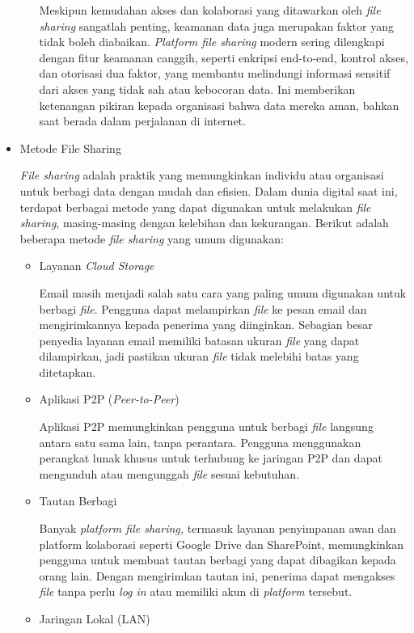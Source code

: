 \documentclass[12pt]{article}
\begin{document}
\begin{itemize}
\begin{itemize}
       Meskipun kemudahan akses dan kolaborasi yang ditawarkan oleh \textit{file sharing} sangatlah penting, keamanan data juga merupakan faktor yang tidak boleh diabaikan. \textit{Platform file sharing} modern sering dilengkapi dengan fitur keamanan canggih, seperti enkripsi end-to-end, kontrol akses, dan otorisasi dua faktor, yang membantu melindungi informasi sensitif dari akses yang tidak sah atau kebocoran data. Ini memberikan ketenangan pikiran kepada organisasi bahwa data mereka aman, bahkan saat berada dalam perjalanan di internet.
       \vspace{2pt}
    \end{itemize}
    \item Metode File Sharing

    \textit{File sharing} adalah praktik yang memungkinkan individu atau organisasi untuk berbagi data dengan mudah dan efisien. Dalam dunia digital saat ini, terdapat berbagai metode yang dapat digunakan untuk melakukan \textit{file sharing}, masing-masing dengan kelebihan dan kekurangan. Berikut adalah beberapa metode \textit{file sharing} yang umum digunakan:

    \begin{itemize}
        \item Layanan \textit{Cloud Storage}

        Email masih menjadi salah satu cara yang paling umum digunakan untuk berbagi \textit{file}. Pengguna dapat melampirkan \textit{file} ke pesan email dan mengirimkannya kepada penerima yang diinginkan. Sebagian besar penyedia layanan email memiliki batasan ukuran \textit{file} yang dapat dilampirkan, jadi pastikan ukuran \textit{file} tidak melebihi batas yang ditetapkan.
        \item Aplikasi P2P (\textit{Peer-to-Peer})

        Aplikasi P2P memungkinkan pengguna untuk berbagi \textit{file} langsung antara satu sama lain, tanpa perantara. Pengguna menggunakan perangkat lunak khusus untuk terhubung ke jaringan P2P dan dapat mengunduh atau mengunggah\textit{ file} sesuai kebutuhan.
        
        \item Tautan Berbagi

        Banyak \textit{platform file sharing,} termasuk layanan penyimpanan awan dan platform kolaborasi seperti Google Drive dan SharePoint, memungkinkan pengguna untuk membuat tautan berbagi yang dapat dibagikan kepada orang lain. Dengan mengirimkan tautan ini, penerima dapat mengakses \textit{file} tanpa perlu \textit{log in} atau memiliki akun di \textit{platform} tersebut.
        \item Jaringan Lokal (LAN)


\end{itemize}
\end{itemize}
\end{document}
